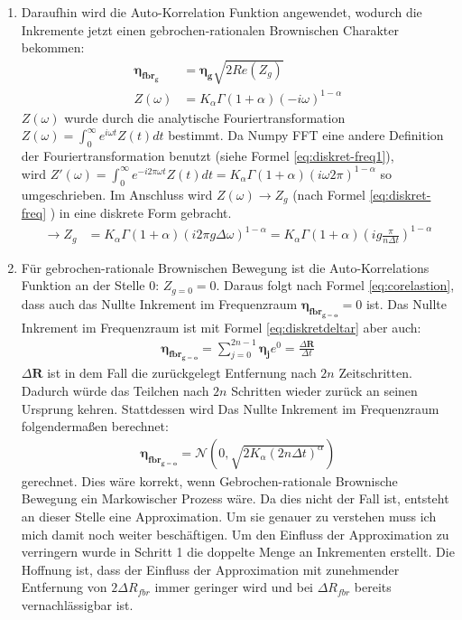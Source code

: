 \documentclass[
  a4paper,BCOR10mm,oneside,
  bibtotoc,idxtotoc,
  headsepline,footsepline,%
  fleqn,openbib
]{scrbook}
\begin{document}
\begin{enumerate}
 \item Daraufhin wird die Auto-Korrelation Funktion  angewendet, wodurch die Inkremente jetzt einen gebrochen-rationalen Brownischen Charakter bekommen: 
 \begin{align}
  \boldsymbol{\eta_{fbr_g}}&=\boldsymbol{\eta_g} \sqrt{2 Re(Z_g)} \label{eq:corelastion} \\
  Z(\omega)&= K_{\alpha} \Gamma(1+\alpha)( - i \omega)^{1-\alpha}
  \end{align}
  $Z(\omega)$ wurde durch die analytische Fouriertransformation $Z(\omega)=\int_0^{\infty}e^{i \omega t} Z(t) dt$ bestimmt. Da Numpy FFT eine andere Definition der Fouriertransformation  benutzt (siehe Formel \ref{eq:diskret-freq1}), \\ wird  $Z'(\omega)=\int_0^{\infty}e^{- i2 \pi \omega t} Z(t)dt= K_{\alpha} \Gamma(1+\alpha)(i \omega 2 \pi)^{1-\alpha}$ so umgeschrieben. Im Anschluss wird $Z(\omega) \longrightarrow Z_g$ (nach Formel \ref{eq:diskret-freq} ) in eine diskrete Form gebracht.
  \begin{align}
  \longrightarrow Z_g&= K_{\alpha} \Gamma(1+\alpha)(i 2 \pi g \Delta \omega)^{1-\alpha} =  K_{\alpha} \Gamma(1+\alpha)(i g \frac{ \pi}{n \Delta t})^{1-\alpha} 
 \end{align}
 \item Für gebrochen-rationale Brownischen Bewegung ist die Auto-Korrelations Funktion  an der Stelle 0: $Z_{g=0}=0$. Daraus folgt nach Formel \ref{eq:corelastion}, dass auch das Nullte Inkrement im Frequenzraum $\boldsymbol{\eta_{fbr_{g=o}}}= 0$ ist. Das Nullte Inkrement im Frequenzraum ist mit Formel \ref{eq:diskretdeltar} aber auch:
 \begin{align}
  \boldsymbol{\eta_{fbr_{g=o}}} = \sum_{j=0}^{2n-1} \boldsymbol{\eta_j} e^{0}=\frac{\Delta  \boldsymbol{R}}{\Delta t}
 \end{align}
$\Delta \boldsymbol{R} $ ist in dem Fall die zurückgelegt Entfernung nach $2n$ Zeitschritten.
Dadurch würde das Teilchen nach $2n$ Schritten wieder zurück an seinen Ursprung kehren. Stattdessen wird Das Nullte Inkrement im Frequenzraum folgendermaßen berechnet:
\begin{align}
\boldsymbol{\eta_{fbr_{g=o}}} = \mathcal{N}(0,\sqrt{2 K_{\alpha} (2n \Delta t)^\alpha})
\end{align}
 gerechnet. Dies wäre korrekt, wenn Gebrochen-rationale Brownische Bewegung ein Markowischer Prozess wäre. Da dies nicht der Fall ist, entsteht an dieser Stelle eine Approximation. Um sie genauer zu verstehen muss ich mich damit noch weiter beschäftigen. Um den Einfluss der Approximation zu verringern wurde in Schritt 1 die doppelte Menge an Inkrementen erstellt. Die Hoffnung ist, dass der Einfluss der Approximation  mit zunehmender Entfernung von $2 \Delta R_{fbr}$ immer geringer wird und bei $\Delta R_{fbr}$ bereits vernachlässigbar ist.

\end{enumerate}
\end{document}
